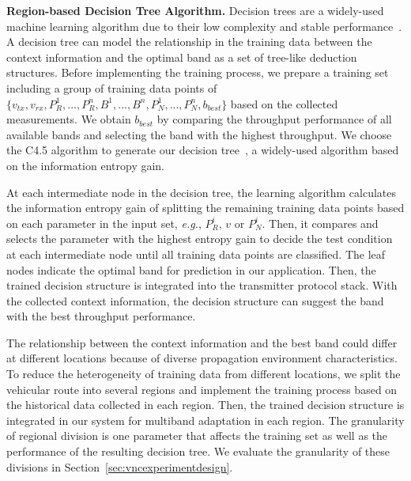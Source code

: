 {\bf Region-based Decision Tree Algorithm.} Decision trees are a  
widely-used machine learning 
algorithm due to their low complexity and stable performance~\cite{banfield2007}.
A decision tree can model the relationship in the training data between the context 
information and the optimal band as a set of tree-like deduction structures. Before 
implementing the training process, we prepare a training set including a group of 
training data points of $\{v_{tx}, v_{rx}, P_R^1, ..., P_R^n,  B^1, ..., B^n, P_N^1, 
..., P_N^n, b_{best}\}$ based on the collected measurements. We obtain $b_{best}$ by comparing
the throughput performance of all available bands and selecting the band with the highest 
throughput. We choose the C4.5 algorithm to generate our decision tree~\cite{hall2009weka}, a widely-used algorithm based on the 
information entropy gain. 

At each intermediate
node in the decision tree, the learning algorithm calculates the information entropy 
gain of splitting the remaining training data points based on each parameter in the input 
set, {\it e.g.}, $P_R^i$, $v$ or $P_N^i$. Then, it compares and selects the parameter with 
the highest entropy gain to decide the test condition at each intermediate node until 
all training data points are classified.  The leaf nodes indicate the optimal band for 
prediction in our application. Then, the trained decision structure is integrated into 
the transmitter protocol stack. With the collected context information, the decision 
structure can suggest the band with the best throughput performance. 

The relationship between the context information and the best band could differ at
different locations because of diverse propagation environment characteristics. 
To reduce the heterogeneity of training data from different locations, we split 
the vehicular route into several regions and implement the training process based 
on the historical data collected in each region. Then, the trained decision structure 
is integrated in our system for multiband adaptation in each region. The granularity 
of regional division is one parameter that affects the training set as well as the 
performance of the resulting decision tree. We 
evaluate the granularity of these divisions in Section~\ref{sec:vncexperimentdesign}.
